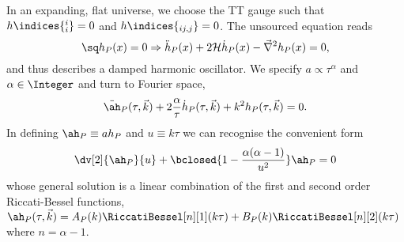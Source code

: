







In an expanding, flat universe, we choose the TT gauge such that $h\indices{^i_i}=0$ and $h\indices{_{ij,j}}=0$. The unsourced equation reads
\begin{equation}
    \sq h_P(x) = 0 \Rightarrow \ddot{h}_P (x) + 2 \mathcal{H}\dot{h}_P(x) - \vec{\nabla}^2 h_P(x) = 0,
\end{equation}
and thus describes a damped harmonic oscillator. 
We specify $a\propto \tau^\alpha$ and $\alpha\in \Integer$ and turn to Fourier space,
\begin{equation}
    \ddot{\ah}_P(\tau, \vec{k}) + 2\frac{\alpha}{\tau} \dot{h}_P(\tau, \vec{k})  + k^2 h_P(\tau, \vec{k})  =0.
\end{equation}
In defining $\ah_P\equiv ah_P$ and $u\equiv k\tau$ we can recognise the convenient form
\begin{equation}
    \dv[2]{\ah_P}{u} + \bclosed{1 - \frac{\alpha(\alpha - 1)}{u^2}} \ah_P  = 0
\end{equation}
whose general solution is a linear combination of the first and second order Riccati-Bessel functions, $\ah_P(\tau, \vec{k}) = A_P(k) \RiccatiBessel[n][1](k\tau) + B_P(k)\RiccatiBessel[n][2](k\tau)$ where $n=\alpha-1$.


